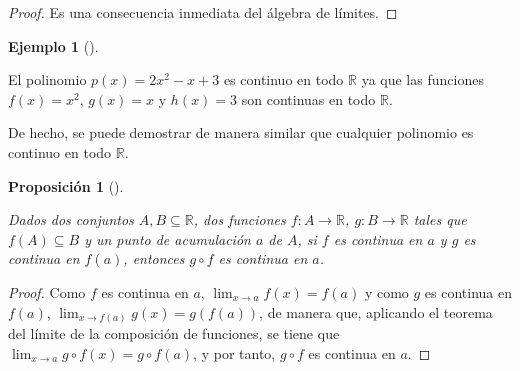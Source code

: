 \documentclass[
  a4paper,
]{scrreport}
\theoremstyle{definition}
\newtheorem{example}{Ejemplo}[chapter]
\theoremstyle{plain}
\theoremstyle{definition}
\theoremstyle{definition}
\theoremstyle{plain}
\theoremstyle{plain}
\newtheorem{proposition}{Proposición}[chapter]
\theoremstyle{remark}
\begin{document}
\begin{tcolorbox}[enhanced jigsaw, leftrule=.75mm, colbacktitle=quarto-callout-note-color!10!white, toprule=.15mm, opacityback=0, opacitybacktitle=0.6, toptitle=1mm, breakable, bottomtitle=1mm, colframe=quarto-callout-note-color-frame, rightrule=.15mm, titlerule=0mm, title=\textcolor{quarto-callout-note-color}{\faInfo}\hspace{0.5em}{Demostración}, arc=.35mm, left=2mm, bottomrule=.15mm, colback=white, coltitle=black]

\begin{proof}
Es una consecuencia inmediata del álgebra de límites.
\end{proof}

\end{tcolorbox}

\begin{example}[]\protect\hypertarget{exm-continuidad-polinomios}{}\label{exm-continuidad-polinomios}

El polinomio \(p(x)=2x^2-x+3\) es continuo en todo \(\mathbb{R}\) ya que
las funciones \(f(x)=x^2\), \(g(x)=x\) y \(h(x)=3\) son continuas en
todo \(\mathbb{R}\).

De hecho, se puede demostrar de manera similar que cualquier polinomio
es continuo en todo \(\mathbb{R}\).

\end{example}

\begin{proposition}[]\protect\hypertarget{prp-continuidad-composicion-funciones}{}\label{prp-continuidad-composicion-funciones}

Dados dos conjuntos \(A,B\subseteq \mathbb{R}\), dos funciones
\(f:A\to \mathbb{R}\), \(g:B\to \mathbb{R}\) tales que
\(f(A)\subseteq B\) y un punto de acumulación \(a\) de \(A\), si \(f\)
es continua en \(a\) y \(g\) es continua en \(f(a)\), entonces
\(g\circ f\) es continua en \(a\).

\end{proposition}

\begin{tcolorbox}[enhanced jigsaw, leftrule=.75mm, colbacktitle=quarto-callout-note-color!10!white, toprule=.15mm, opacityback=0, opacitybacktitle=0.6, toptitle=1mm, breakable, bottomtitle=1mm, colframe=quarto-callout-note-color-frame, rightrule=.15mm, titlerule=0mm, title=\textcolor{quarto-callout-note-color}{\faInfo}\hspace{0.5em}{Demostración}, arc=.35mm, left=2mm, bottomrule=.15mm, colback=white, coltitle=black]

\begin{proof}
Como \(f\) es continua en \(a\), \(\lim_{x\to a}f(x)=f(a)\) y como \(g\)
es continua en \(f(a)\), \(\lim_{x\to f(a)}g(x)=g(f(a))\), de manera
que, aplicando el teorema del límite de la composición de funciones, se
tiene que \(\lim_{x\to a}g\circ f(x)= g\circ f(a)\), y por tanto,
\(g\circ f\) es continua en \(a\).
\end{proof}

\end{tcolorbox}
\end{document}
